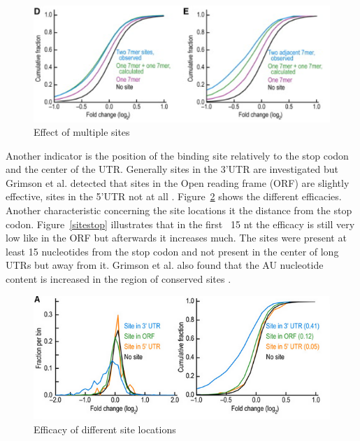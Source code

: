 \documentclass[12pt]{article}
\begin{document}
\begin{figure}
\centering
\includegraphics[scale=0.8]{results/sites_distance.PNG}
\caption{Effect of multiple sites}
\label{sitedistance}
\end{figure}

Another indicator is the position of the binding site relatively to the stop codon and the center of the UTR. Generally sites in the 3'UTR are investigated but Grimson et al. detected that sites in the Open reading frame (ORF) are slightly effective, sites in the 5'UTR not at all \cite{Grimson}. Figure~\ref{siteorf} shows the different efficacies. Another characteristic concerning the site locations it the distance from the stop codon. Figure~\ref{sitestop} illustrates that in the first ~15 nt the efficacy is still very low like in the ORF but afterwards it increases much. 
The sites were present at least 15 nucleotides from the stop codon and not present in the center of long UTRs but away from it. Grimson et al. also found that the AU nucleotide content is increased in the region of conserved sites \cite{Grimson}.


\begin{figure}
\centering
\includegraphics[scale=0.8]{results/sites_orf.PNG}
\caption{Efficacy of different site locations}
\label{siteorf}
\end{figure}
\end{document}
